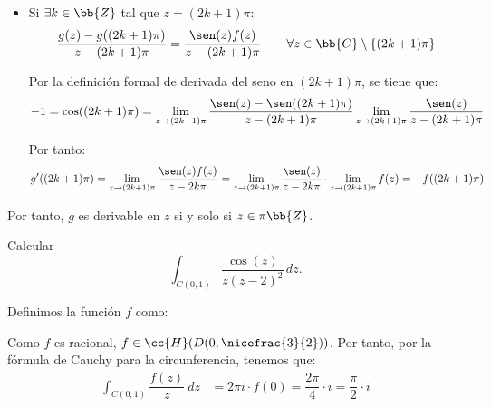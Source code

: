 \documentclass[12pt]{article}
\begin{document}
\begin{ejercicio}[3 puntos]
\begin{itemize}
            \item Si $\exists k\in \bb{Z}$ tal que $z=(2k+1)\pi$:
            \begin{equation*}
                \dfrac{g(z)-g((2k+1)\pi)}{z-(2k+1)\pi} = \dfrac{\sen(z)f(z)}{z-(2k+1)\pi}\qquad \forall z\in \bb{C}\setminus \{(2k+1)\pi\}
            \end{equation*}

            Por la definición formal de derivada del seno en $(2k+1)\pi$, se tiene que:
            \begin{equation*}
                -1 = \cos((2k+1)\pi) = \lim_{z\to (2k+1)\pi}\dfrac{\sen(z)-\sen((2k+1)\pi)}{z-(2k+1)\pi}
                \lim_{z\to (2k+1)\pi}\dfrac{\sen(z)}{z-(2k+1)\pi}
            \end{equation*}

            Por tanto:
            \begin{equation*}
                g'((2k+1)\pi) = \lim_{z\to (2k+1)\pi}\dfrac{\sen(z)f(z)}{z-2k\pi}
                = \lim_{z\to (2k+1)\pi}\dfrac{\sen(z)}{z-2k\pi}\cdot \lim_{z\to (2k+1)\pi} f(z)
                = -f((2k+1)\pi)
            \end{equation*}
        \end{itemize}
        Por tanto, $g$ es derivable en $z$ si y solo si $z\in \pi \bb{Z}$.
    \end{ejercicio}

    \begin{ejercicio}[1 punto]
        Calcular
        \[
            \int_{C(0,1)} \dfrac{\cos(z)}{z(z-2)^2} \, dz.
        \]

        Definimos la función $f$ como:

        Como $f$ es racional, $f\in \cc{H}(D(0,\nicefrac{3}{2}))$. Por tanto, por la fórmula de Cauchy para la circunferencia, tenemos que:
        \begin{align*}
            \int_{C(0,1)} \dfrac{f(z)}{z}\ dz &= 2\pi i \cdot f(0)=\dfrac{2\pi}{4}\cdot i = \dfrac{\pi}{2}\cdot i
        \end{align*}
    \end{ejercicio}
\end{document}
